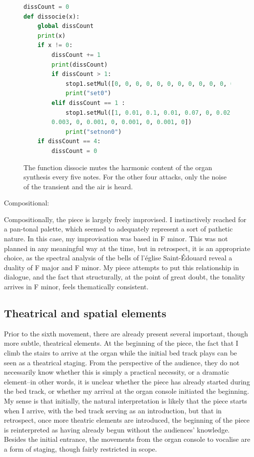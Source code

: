 \documentclass[12pt,twoside,maitrise]{dms_ks}
\theoremstyle{definition}
\begin{document}
\begin{figure}[H]
\begin{lstlisting}[language=Python]
dissCount = 0
def dissocie(x):
    global dissCount
    print(x)
    if x != 0:
        dissCount += 1
        print(dissCount)
        if dissCount > 1:
            stop1.setMul([0, 0, 0, 0, 0, 0, 0, 0, 0, 0, 0, 0, 0, 0, 0, 0, 0, 0, 0, 0])
            print("set0")
        elif dissCount == 1 :
            stop1.setMul([1, 0.01, 0.1, 0.01, 0.07, 0, 0.02, 0, 0.01, 0, 0.003, 0,
	    0.003, 0, 0.001, 0, 0.001, 0, 0.001, 0])
            print("setnon0")
    if dissCount == 4:
        dissCount = 0
\end{lstlisting}
\caption{The function dissocie mutes the harmonic content of the organ synthesis every five notes.
For the other four attacks, only the noise of the transient and the air is heard.}
\end{figure}

Compositional:

Compositionally, the piece is largely freely improvised.
I instinctively reached for a pan-tonal palette, which seemed to adequately represent a sort of pathetic nature.
In this case, my improvisation was based in F minor.
This was not planned in any meaningful way at the time, but in retrospect, it is an appropriate choice, as the spectral analysis of the bells of l'église Saint-Édouard reveal a duality of F major and F minor.
My piece attempts to put this relationship in dialogue, and the fact that structurally, at the point of great doubt, the tonality arrives in F minor, feels thematically consistent.


\subsection{Theatrical and spatial elements}

Prior to the sixth movement, there are already present several important, though more subtle, theatrical elements.
At the beginning of the piece, the fact that I climb the stairs to arrive at the organ while the initial bed track plays can be seen as a theatrical staging.
From the perspective of the audience, they do not necessarily know whether this is simply a practical necessity, or a dramatic element--in other words, it is unclear whether the piece has already started during the bed track, or whether my arrival at the organ console initiated the beginning.
My sense is that initially, the natural interpretation is likely that the piece starts when I arrive, with the bed track serving as an introduction, but that in retrospect, once more theatric elements are introduced, the beginning of the piece is reinterpreted as having already begun without the audiences' knowledge.
Besides the initial entrance, the movements from the organ console to vocalise are a form of staging, though fairly restricted in scope.
\end{document}
